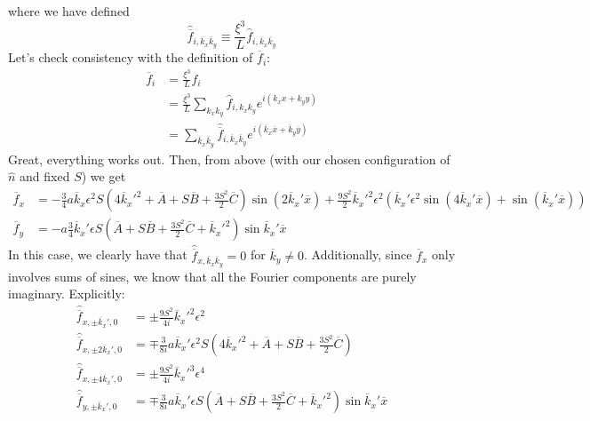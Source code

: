 \documentclass[reqno]{article}
\begin{document}
	where we have defined
	\begin{equation}
		\hat{\overline{f}}_{i, \overline{k}_x \overline{k}_y} 
		\equiv \frac{\xi^3}{L} \hat{f}_{i, \overline{k}_x \overline{k}_y}
	\end{equation}
	Let's check consistency with the definition of $\overline{f}_i$:
	\begin{equation}
	\begin{split}
		\overline{f}_i
		&= \frac{\xi^3}{L} f_i \\
		&= \frac{\xi^3}{L} \sum_{k_x k_y}
		\hat{f}_{i, k_x k_y} e^{i\left( k_x x + k_y y \right)} \\
		&= \sum_{\overline{k}_x \overline{k}_y}
		\hat{\overline{f}}_{i, \overline{k}_x \overline{k}_y}
		e^{i \left( \overline{k}_x \overline{x} + \overline{k}_y \overline{y} \right)}
	\end{split}
	\end{equation}
	Great, everything works out. 
	Then, from above (with our chosen configuration of $\hat{n}$ and fixed $S$) we get
	\begin{equation}
	\begin{split}
		\overline{f}_x
		&= -\tfrac34 a \overline{k}_x \epsilon^2 S \left( 
		4 \overline{k}_x'^2
		+ \overline{A} 
		+ S\overline{B}
		+ \frac{3 S^2}{2} \overline{C}
		\right) 
		\sin \left(
		2 \overline{k}_x' \overline{x}
		\right)
		+ \frac{9 S^2}{2}\overline{k}_x'^2 \epsilon^2
		\left(
		\overline{k}_x' \epsilon^2 \sin \left(
		4 \overline{k}_x' \overline{x}
		\right)
		+ \sin \left(
		\overline{k}_x' \overline{x}
		\right)
		\right) \\
		\overline{f}_y
		&= -a \tfrac34 \overline{k}_x' \epsilon S
		\left(
		\overline{A}
		+ S \overline{B}
		+ \frac{3 S^2}{2} \overline{C} 
		+ \overline{k}_x'^2
		\right)
		\sin \overline{k}_x' \overline{x}
	\end{split}
	\end{equation}
	In this case, we clearly have that $\hat{\overline{f}}_{x, \overline{k}_x \overline{k}_y} = 0$ for $\overline{k}_y \neq 0$. Additionally, since $\overline{f}_x$ only involves sums of sines, we know that all the Fourier components are purely imaginary. Explicitly:
	\begin{equation}
	\begin{split}
		\hat{\overline{f}}_{x, \pm\overline{k}_x', 0}
		&= \pm\frac{9 S^2}{4i} \overline{k}_x'^2 \epsilon^2 \\
		\hat{\overline{f}}_{x, \pm 2 \overline{k}_x', 0}
		&= \mp\frac{3}{8i} a \overline{k}_x' \epsilon^2 S \left(
		4 \overline{k}_x'^2 
		+ \overline{A} 
		+ S \overline{B}
		+ \frac{3 S^2}{2} \overline{C}
		\right) \\
		\hat{\overline{f}}_{x, \pm 4\overline{k}_x', 0}
		&= \pm \frac{9 S^2}{4i} \overline{k}_x'^3 \epsilon^4 \\
		\hat{\overline{f}}_{y, \pm \overline{k}_x', 0}
		&= \mp \frac{3}{8i} a \overline{k}_x' \epsilon S
		\left(
		\overline{A} 
		+ S\overline{B}
		+ \frac{3S^2}{2} \overline{C}
		+ \overline{k}_x'^2
		\right)
		\sin \overline{k}_x' \overline{x}
	\end{split}
	\end{equation}
\end{document}
